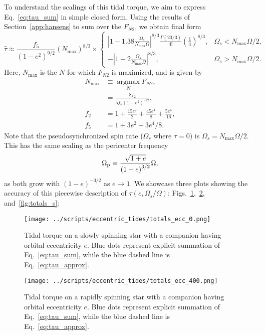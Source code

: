\documentclass[
        fleqn,
        usenatbib,
        referee,
    ]{mnras}
\newcommand*{\abs}[1]{\left|#1\right|}
\newcommand*{\p}[1]{\left(#1\right)}
\DeclareMathOperator*{\argmax}{argmax}
\begin{document}
To understand the scalings of this tidal torque, we aim to express
Eq.~\eqref{eq:tau_sum} in simple closed form. Using the results of
Section~\ref{app:hansens} to sum over the $F_{N2}$, we obtain final form
\begin{equation}
    \hat{\tau} \approx
        \frac{f_5}{\p{1 - e^2}^{9/2}}\p{N_{\max}}^{8/3} \times
    \begin{cases}
        \abs{1 - 1.38\frac{\Omega_s}{N_{\max}\Omega}}^{8/3}
            \frac{\Gamma(23/3)}{4!}\p{\frac{1}{4}}^{8/3},
            & \Omega_s < N_{\max}\Omega / 2,\\[5pt]
        -\abs{1 - 2\frac{\Omega_s}{N_{\max}\Omega}}^{8/3},
            & \Omega_s > N_{\max}\Omega / 2.
    \end{cases}\label{eq:tau_approx}
\end{equation}
Here, $N_{\max}$ is the $N$ for which $F_{N2}$ is maximized, and is given by
\begin{align}
    N_{\max} &\equiv \argmax\limits_N F_{N2},\nonumber\\
        &= \frac{8f_2}{5f_5\p{1 - e^2}^{3/2}},\\
    f_2 &= 1 + \frac{15e^2}{2} + \frac{45 e^4}{8} + \frac{5e^6}{16},
        \label{eq:f2}\\
    f_5 &= 1 + 3e^2 + 3e^4/8.\label{eq:f5}
\end{align}
Note that the pseudosynchronized spin rate ($\Omega_s$ where $\tau = 0$) is
$\Omega_s = N_{\max} \Omega / 2$. This has the same scaling as the pericenter
frequency
\begin{equation}
    \Omega_{\rm p} \equiv \frac{\sqrt{1 + e}}{\p{1 - e}^{3/2}}\Omega,
\end{equation}
as both grow with $\p{1 - e}^{-3/2}$ as $e \to 1$. We showcase three plots
showing the accuracy of this piecewise description of $\tau\p{e, \Omega_s /
\Omega}$: Figs.~\ref{fig:totals_ecc0},~\ref{fig:totals_ecc400},
and~\ref{fig:totals_s}:
\begin{figure}
    \centering
    \texttt{[image: ../scripts/eccentric\_tides/totals\_ecc\_0.png]}
    \caption{Tidal torque on a slowly spinning star with a companion having
    orbital eccentricity $e$. Blue dots represent explicit summation of
    Eq.~\eqref{eq:tau_sum}, while the blue dashed line is
    Eq.~\eqref{eq:tau_approx}.}\label{fig:totals_ecc0}
\end{figure}
\begin{figure}
    \centering
    \texttt{[image: ../scripts/eccentric\_tides/totals\_ecc\_400.png]}
    \caption{Tidal torque on a rapidly spinning star with a companion having
    orbital eccentricity $e$. Blue dots represent explicit summation of
    Eq.~\eqref{eq:tau_sum}, while the blue dashed line is
    Eq.~\eqref{eq:tau_approx}.}\label{fig:totals_ecc400}
\end{figure}
\end{document}
